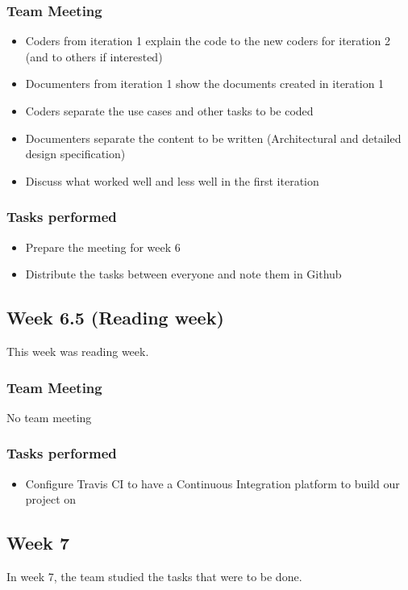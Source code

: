 \documentclass[12pt]{article}
\begin{document}
\subsubsection{Team Meeting}
\begin{itemize}
    \item Coders from iteration 1 explain the code to the new coders for iteration 2 (and to others if interested)
    \item Documenters from iteration 1 show the documents created in iteration 1
    \item Coders separate the use cases and other tasks to be coded
    \item Documenters separate the content to be written (Architectural and detailed design specification)
    \item Discuss what worked well and less well in the first iteration
\end{itemize}

\subsubsection{Tasks performed}
\begin{itemize}
    \item Prepare the meeting for week 6
    \item Distribute the tasks between everyone and note them in Github
\end{itemize}

\subsection{Week 6.5 (Reading week)}
This week was reading week.

\subsubsection{Team Meeting}
No team meeting

\subsubsection{Tasks performed}
\begin{itemize}
    \item Configure Travis CI to have a Continuous Integration platform to build our project on
\end{itemize}

\subsection{Week 7}
In week 7, the team studied the tasks that were to be done.
\end{document}
